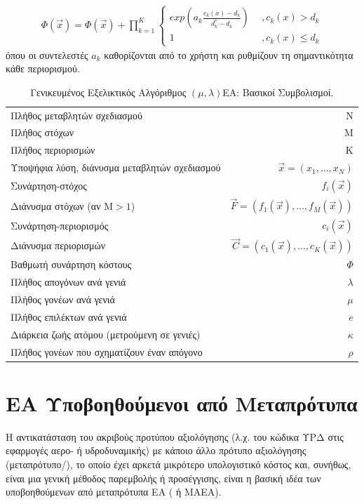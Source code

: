 \begin{eqnarray}
	\Phi(\vec{x})=\Phi(\vec{x})+ \prod _{k=1}^K{\left\{ 				\begin{array}{ll}
    exp(a_k\frac{c_k(x)-d_k}{d_k^* -d_k}) & ~~,c_k(x)>d_k\\
    1 & ~~,c_k(x)\leq d_k\end{array} \right. }
    \label{penal2}
\end{eqnarray}
όπου οι συντελεστές $a_k$ καθορίζονται από το χρήστη και ρυθμίζουν τη σημαντικότητα κάθε περιορισμού.


\begin{table}[htdp]
\centering
\begin{tabular}{lr} 
\hline
\hline
Πλήθος μεταβλητών σχεδιασμού & N\\
Πλήθος στόχων & M\\
Πλήθος περιορισμών   & K\\
\hline
Υποψήφια λύση, διάνυσμα μεταβλητών σχεδιασμού   & $\vec{x}=(x_1,...,x_N)$\\
Συνάρτηση-στόχος &$f_i(\vec{x})$ \\
Διάνυσμα στόχων (αν Μ$>\!1$)  &$\vec{F}=(f_1(\vec{x}),...,f_M(\vec{x}))$\\
Συνάρτηση-περιορισμός &$c_i(\vec{x})$ \\
Διάνυσμα περιορισμών  & $\vec{C}=(c_1(\vec{x}),...,c_K(\vec{x}))$\\
Βαθμωτή συνάρτηση κόστους & $\Phi$ \\
\hline
Πλήθος απογόνων ανά γενιά &   $\lambda$ 			\\
Πλήθος γονέων ανά γενιά&  $\mu$ 				\\
Πλήθος επιλέκτων ανά γενιά&  $e$			\\
Διάρκεια ζωής ατόμου (μετρούμενη σε γενιές)&  $\kappa$			\\
Πλήθος γονέων που σχηματίζουν έναν απόγονο &  $\rho$			\\
\hline
\hline
\end{tabular}
\caption{Γενικευμένος Εξελικτικός Αλγόριθμος $(\mu,\lambda)$EA: Βασικοί Συμβολισμοί.}
\label{GEA nomenclature} 
\end{table}



\section{ΕΑ Υποβοηθούμενοι από Μεταπρότυπα}
Η αντικατάσταση του ακριβούς προτύπου αξιολόγησης (λ.χ. του κώδικα ΥΡΔ στις εφαρμογές αερο- ή υδροδυναμικής) με κάποιο άλλο πρότυπο αξιολόγησης  (μεταπρότυπο/), το οποίο έχει αρκετά μικρότερο υπολογιστικό κόστος και, συνήθως, είναι μια γενική μέθοδος παρεμβολής ή προσέγγισης, είναι η βασική ιδέα των υποβοηθούμενων από μεταπρότυπα ΕΑ ( ή ΜΑΕΑ).

